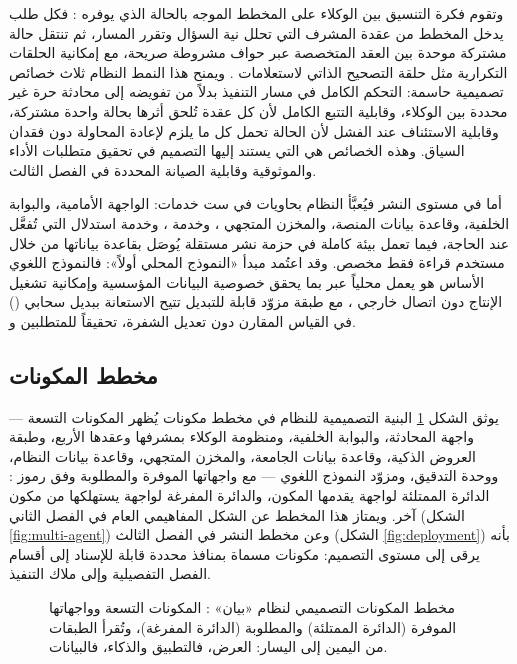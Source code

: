 وتقوم فكرة التنسيق بين الوكلاء على المخطط الموجه بالحالة الذي يوفره : فكل طلب يدخل المخطط من عقدة المشرف التي تحلل نية السؤال وتقرر المسار، ثم تنتقل حالة مشتركة موحدة بين العقد المتخصصة عبر حواف مشروطة صريحة، مع إمكانية الحلقات التكرارية مثل حلقة التصحيح الذاتي لاستعلامات . ويمنح هذا النمط النظام ثلاث خصائص تصميمية حاسمة: التحكم الكامل في مسار التنفيذ بدلاً من تفويضه إلى محادثة حرة غير محددة بين الوكلاء، وقابلية التتبع الكامل لأن كل عقدة تُلحق أثرها بحالة واحدة مشتركة، وقابلية الاستئناف عند الفشل لأن الحالة تحمل كل ما يلزم لإعادة المحاولة دون فقدان السياق. وهذه الخصائص هي التي يستند إليها التصميم في تحقيق متطلبات الأداء  والموثوقية  وقابلية الصيانة  المحددة في الفصل الثالث.

أما في مستوى النشر فيُعبَّأ النظام بحاويات  في ست خدمات: الواجهة الأمامية، والبوابة الخلفية، وقاعدة بيانات المنصة، والمخزن المتجهي ، وخدمة ، وخدمة استدلال  التي تُفعَّل عند الحاجة، فيما تعمل بيئة  كاملة في حزمة نشر مستقلة يُوصَل بقاعدة بياناتها من خلال مستخدم قراءة فقط مخصص. وقد اعتُمد مبدأ «النموذج المحلي أولاً»: فالنموذج اللغوي الأساس هو  يعمل محلياً عبر  بما يحقق خصوصية البيانات المؤسسية وإمكانية تشغيل الإنتاج دون اتصال خارجي ، مع طبقة مزوّد قابلة للتبديل تتيح الاستعانة ببديل سحابي () في القياس المقارن دون تعديل الشفرة، تحقيقاً للمتطلبين  و.

\subsection{مخطط المكونات}
\label{subsec:arch-components}

يوثق الشكل \ref{fig:component-diagram} البنية التصميمية للنظام في مخطط مكونات  يُظهر المكونات التسعة — واجهة المحادثة، والبوابة الخلفية، ومنظومة الوكلاء بمشرفها وعقدها الأربع، وطبقة العروض الذكية، وقاعدة بيانات الجامعة، والمخزن المتجهي، وقاعدة بيانات النظام، ووحدة التدقيق، ومزوّد النموذج اللغوي — مع واجهاتها الموفرة والمطلوبة وفق رموز : الدائرة الممتلئة لواجهة يقدمها المكون، والدائرة المفرغة لواجهة يستهلكها من مكون آخر. ويمتاز هذا المخطط عن الشكل المفاهيمي العام في الفصل الثاني (الشكل \ref{fig:multi-agent}) وعن مخطط النشر في الفصل الثالث (الشكل \ref{fig:deployment}) بأنه يرقى إلى مستوى التصميم: مكونات مسماة بمنافذ محددة قابلة للإسناد إلى أقسام الفصل التفصيلية وإلى ملاك التنفيذ.

\begin{figure}[H]
  \centering
  
  \caption{مخطط المكونات التصميمي لنظام «بيان» : المكونات التسعة وواجهاتها الموفرة (الدائرة الممتلئة) والمطلوبة (الدائرة المفرغة)، وتُقرأ الطبقات من اليمين إلى اليسار: العرض، فالتطبيق والذكاء، فالبيانات.}
  \label{fig:component-diagram}
\end{figure}

